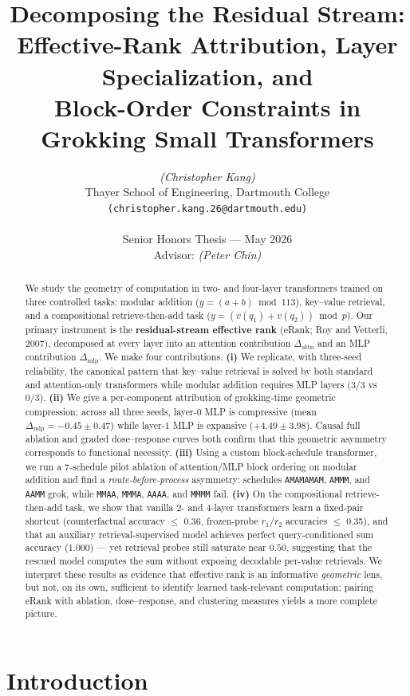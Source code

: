 \documentclass{article}
\title{Decomposing the Residual Stream:\\
Effective-Rank Attribution, Layer Specialization, and\\
Block-Order Constraints in Grokking Small Transformers}
\author{%
  \textit{(Christopher Kang)}\\
  Thayer School of Engineering, Dartmouth College\\
  \texttt{(christopher.kang.26@dartmouth.edu)}\\
  \\
  Senior Honors Thesis --- May 2026\\
  Advisor: \textit{(Peter Chin)}
}
\begin{document}
\maketitle

\begin{abstract}
We study the geometry of computation in two- and four-layer transformers trained on three controlled tasks: modular addition ($y=(a+b)\bmod 113$), key--value retrieval, and a compositional retrieve-then-add task ($y=(v(q_1)+v(q_2))\bmod p$). Our primary instrument is the \textbf{residual-stream effective rank} (eRank; Roy and Vetterli, 2007), decomposed at every layer into an attention contribution $\Delta_{\text{attn}}$ and an MLP contribution $\Delta_{\text{mlp}}$. We make four contributions. \textbf{(i)} We replicate, with three-seed reliability, the canonical pattern that key--value retrieval is solved by both standard and attention-only transformers while modular addition requires MLP layers (3/3 vs 0/3). \textbf{(ii)} We give a per-component attribution of grokking-time geometric compression: across all three seeds, layer-0 MLP is compressive (mean $\Delta_{\text{mlp}}=-0.45\pm0.47$) while layer-1 MLP is expansive ($+4.49\pm3.98$). Causal full ablation and graded dose--response curves both confirm that this geometric asymmetry corresponds to functional necessity. \textbf{(iii)} Using a custom block-schedule transformer, we run a 7-schedule pilot ablation of attention/MLP block ordering on modular addition and find a \emph{route-before-process} asymmetry: schedules \texttt{AMAMAMAM}, \texttt{AMMM}, and \texttt{AAMM} grok, while \texttt{MMAA}, \texttt{MMMA}, \texttt{AAAA}, and \texttt{MMMM} fail. \textbf{(iv)} On the compositional retrieve-then-add task, we show that vanilla 2- and 4-layer transformers learn a fixed-pair shortcut (counterfactual accuracy $\le$ 0.36, frozen-probe $r_1/r_2$ accuracies $\le$ 0.35), and that an auxiliary retrieval-supervised model achieves perfect query-conditioned sum accuracy ($1.000$) --- yet retrieval probes still saturate near $0.50$, suggesting that the rescued model computes the sum without exposing decodable per-value retrievals. We interpret these results as evidence that effective rank is an informative \emph{geometric} lens, but not, on its own, sufficient to identify learned task-relevant computation; pairing eRank with ablation, dose--response, and clustering measures yields a more complete picture.
\end{abstract}

\section{Introduction}
\label{sec:intro}
\end{document}
